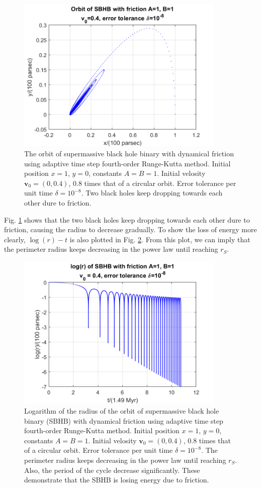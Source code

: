 \documentclass[12pt, graphicx]{article}
\begin{document}
\begin{figure}[ht]
\centering
\includegraphics[width = 100mm]{BH_b8.png}
\caption{The orbit of supermassive black hole binary with dynamical friction using adaptive time step fourth-order Runge-Kutta method. Initial position $x=1$, $y=0$, constants $A=B=1$. Initial velosity $\mathbf{v}_0=(0,0.4)$, 0.8 times that of a circular orbit. Error tolerance per unit time $\delta=10^{-8}$. Two black holes keep dropping towards each other dure to friction.}
\label{fig:BHb}
\end{figure}

Fig. \ref{fig:BHb} shows that the two black holes keep dropping towards each other dure to friction, causing the radius to decrease gradually. To show the loss of energy more clearly, $\log(r)-t$ is also plotted in Fig. \ref{fig:BHblogr}. From this plot, we can imply that the perimeter radius keeps decreasing in the power law until reaching $r_S$. 

\begin{figure}[ht]
\centering
\includegraphics[width = 100mm]{BH_b8logr.png}
\caption{Logarithm of the radius of the orbit of supermassive black hole binary (SBHB) with dynamical friction using adaptive time step fourth-order Runge-Kutta method. Initial position $x=1$, $y=0$, constants $A=B=1$. Initial velosity $\mathbf{v}_0=(0,0.4)$, 0.8 times that of a circular orbit. Error tolerance per unit time $\delta=10^{-8}$. The perimeter radius keeps decreasing in the power law until reaching $r_S$. Also, the period of the cycle decrease significantly. These demonstrate that the SBHB is losing energy due to friction.}
\label{fig:BHblogr}
\end{figure}
\end{document}
